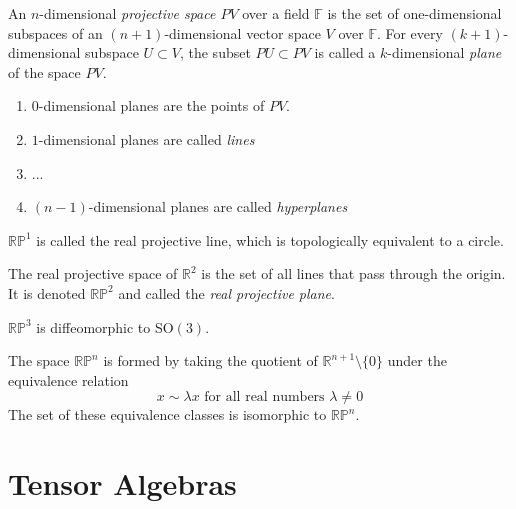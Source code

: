 \documentclass{article}
\begin{document}
    \begin{definition}
      An $n$-dimensional \textit{projective space $PV$} over a field $\mathbb{F}$ is the set of one-dimensional subspaces of an $(n+1)$-dimensional vector space $V$ over $\mathbb{F}$. For every $(k+1)$-dimensional subspace $U \subset V$, the subset $PU \subset PV$ is called a $k$-dimensional \textit{plane} of the space $PV$. 
      \begin{enumerate}
        \item $0$-dimensional planes are the points of $PV$. 
        \item $1$-dimensional planes are called \textit{lines}
        \item ...
        \item $(n-1)$-dimensional planes are called \textit{hyperplanes}
      \end{enumerate}
    \end{definition}

    \begin{definition}
      $\mathbb{RP}^1$ is called the real projective line, which is topologically equivalent to a circle. 
    \end{definition}

    \begin{example}
      The real projective space of $\mathbb{R}^2$ is the set of all lines that pass through the origin. It is denoted $\mathbb{R P}^2$ and called the \textit{real projective plane}. 
    \end{example}

    \begin{example}
      $\mathbb{RP}^3$ is diffeomorphic to SO$(3)$. 
    \end{example}

    \begin{example}
      The space $\mathbb{RP}^n$ is formed by taking the quotient of $\mathbb{R}^{n+1} \setminus \{0\}$ under the equivalence relation 
      \begin{equation}
        x \sim \lambda x \text{ for all real numbers } \lambda \neq 0
      \end{equation}
      The set of these equivalence classes is isomorphic to $\mathbb{RP}^n$. 
    \end{example}

\section{Tensor Algebras}
\end{document}
